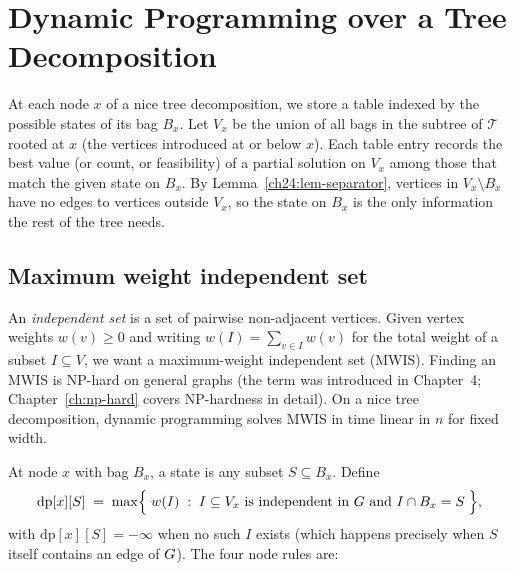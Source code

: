 \section{Dynamic Programming over a Tree Decomposition}
\label{ch24:dp}

At each node $x$ of a nice tree decomposition, we store a table indexed by the
possible states of its bag $B_x$. Let $V_x$ be the union of all bags in the
subtree of $\mathcal{T}$ rooted at $x$ (the vertices introduced at or below $x$).
Each table entry records the best value (or count, or feasibility) of a partial
solution on $V_x$ among those that match the given state on $B_x$. By
Lemma~\ref{ch24:lem-separator}, vertices in $V_x\setminus B_x$ have no edges to
vertices outside $V_x$, so the state on $B_x$ is the only information the rest of
the tree needs.

\subsection{Maximum weight independent set}

An \emph{independent set} is a set of pairwise non-adjacent vertices. Given vertex
weights $w(v)\ge 0$ and writing $w(I)=\sum_{v\in I} w(v)$ for the total weight of a
subset $I\subseteq V$, we want a maximum-weight independent set (MWIS). Finding an
MWIS is NP-hard on general graphs (the term was introduced in Chapter~4;
Chapter~\ref{ch:np-hard} covers NP-hardness in detail). On a nice tree decomposition, dynamic
programming solves MWIS in time linear in $n$ for fixed width.

At node $x$ with bag $B_x$, a state is any subset $S\subseteq B_x$. Define
\[
  \mathrm{dp}[x][S] \;=\;
  \max\Bigl\{\; w(I) \;:\; I\subseteq V_x \text{ is independent in }G \text{ and }
  I\cap B_x = S \;\Bigr\},
\]
with $\mathrm{dp}[x][S]=-\infty$ when no such $I$ exists (which happens precisely
when $S$ itself contains an edge of $G$). The four node rules are:

